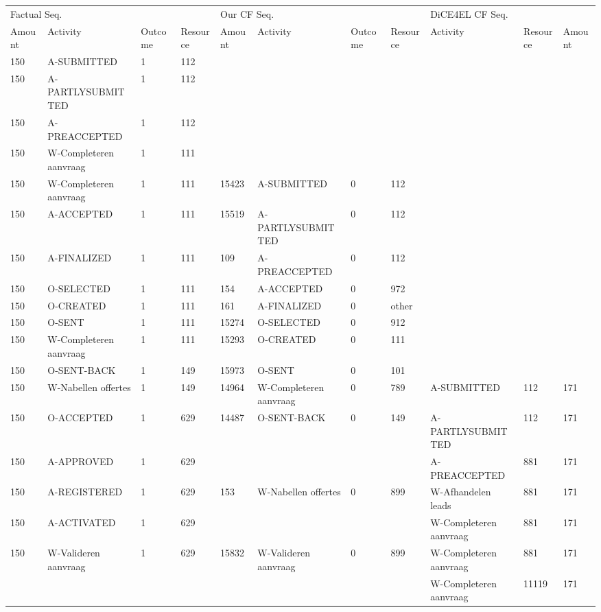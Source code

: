 \begin{tabular}{lllllllllll}
\toprule
\multicolumn{4}{l}{Factual Seq.} & \multicolumn{4}{l}{Our CF Seq.} & \multicolumn{3}{l}{DiCE4EL CF Seq.} \\
Amount & Activity & Outcome & Resource & Amount & Activity & Outcome & Resource & Activity & Resource & Amount \\
\midrule
150 & A-SUBMITTED & 1 & 112 &  &  &  &  &  &  &  \\
150 & A-PARTLYSUBMITTED & 1 & 112 &  &  &  &  &  &  &  \\
150 & A-PREACCEPTED & 1 & 112 &  &  &  &  &  &  &  \\
150 & W-Completeren aanvraag & 1 & 111 &  &  &  &  &  &  &  \\
150 & W-Completeren aanvraag & 1 & 111 & 15423 & A-SUBMITTED & 0 & 112 &  &  &  \\
150 & A-ACCEPTED & 1 & 111 & 15519 & A-PARTLYSUBMITTED & 0 & 112 &  &  &  \\
150 & A-FINALIZED & 1 & 111 & 109 & A-PREACCEPTED & 0 & 112 &  &  &  \\
150 & O-SELECTED & 1 & 111 & 154 & A-ACCEPTED & 0 & 972 &  &  &  \\
150 & O-CREATED & 1 & 111 & 161 & A-FINALIZED & 0 & other &  &  &  \\
150 & O-SENT & 1 & 111 & 15274 & O-SELECTED & 0 & 912 &  &  &  \\
150 & W-Completeren aanvraag & 1 & 111 & 15293 & O-CREATED & 0 & 111 &  &  &  \\
150 & O-SENT-BACK & 1 & 149 & 15973 & O-SENT & 0 & 101 &  &  &  \\
150 & W-Nabellen offertes & 1 & 149 & 14964 & W-Completeren aanvraag & 0 & 789 & A-SUBMITTED & 112 & 171 \\
150 & O-ACCEPTED & 1 & 629 & 14487 & O-SENT-BACK & 0 & 149 & A-PARTLYSUBMITTED & 112 & 171 \\
150 & A-APPROVED & 1 & 629 &  &  &  &  & A-PREACCEPTED & 881 & 171 \\
150 & A-REGISTERED & 1 & 629 & 153 & W-Nabellen offertes & 0 & 899 & W-Afhandelen leads & 881 & 171 \\
150 & A-ACTIVATED & 1 & 629 &  &  &  &  & W-Completeren aanvraag & 881 & 171 \\
150 & W-Valideren aanvraag & 1 & 629 & 15832 & W-Valideren aanvraag & 0 & 899 & W-Completeren aanvraag & 881 & 171 \\
 &  &  &  &  &  &  &  & W-Completeren aanvraag & 11119 & 171 \\
\bottomrule
\end{tabular}
